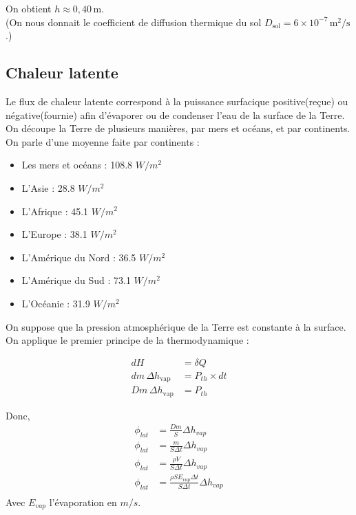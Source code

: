 \documentclass[a4paper,12pt]{article}
\begin{document}
On obtient \( h \approx 0{,}40\,\mathrm{m} \).\\

(On nous donnait le coefficient de diffusion thermique du sol \( D_{\text{sol}} = 6 \times 10^{-7} \,\mathrm{m}^2/\mathrm{s} \).)



\subsection*{Chaleur latente}


Le flux de chaleur latente correspond à la puissance surfacique positive(reçue) ou négative(fournie) afin d'évaporer ou de condenser l'eau de la surface de la Terre.
On découpe la Terre de plusieurs manières, par mers et océans, et par continents. 
On parle d'une moyenne faite par continents :
\begin{itemize}
    \item Les mers et océans : 108.8 $W/m^2$
    \item L'Asie : 28.8 $W/m^2$
    \item L'Afrique : 45.1 $W/m^2$
    \item L'Europe : 38.1 $W/m^2$
    \item L'Amérique du Nord : 36.5 $W/m^2$
    \item L'Amérique du Sud : 73.1 $W/m^2$
    \item L'Océanie : 31.9 $W/m^2$
\end{itemize}

On suppose que la pression atmosphérique de la Terre est constante à la surface. On applique le premier principe de la thermodynamique :

\vspace{1cm}
\begin{align*}
    dH &= \delta Q \\
    dm \, \Delta h_{\text{vap}} &= P_{th} \times dt \\
    Dm \, \Delta h_{\text{vap}} &= P_{th}
\end{align*}

Donc, 
\begin{align*}
    \phi _{lat} &= \frac{Dm}{S}\Delta h_{vap}\\
    \phi _{lat} &= \frac{m}{S\Delta t}\Delta h_{vap}\\
    \phi _{lat} &= \frac{\rho V}{S\Delta t}\Delta h_{vap}\\
    \phi _{lat} &= \frac{\rho S E_{vap} \Delta t}{S\Delta t}\Delta h_{vap}\\
\end{align*}
Avec $E_{vap}$ l'évaporation en $m/s$.
\end{document}
